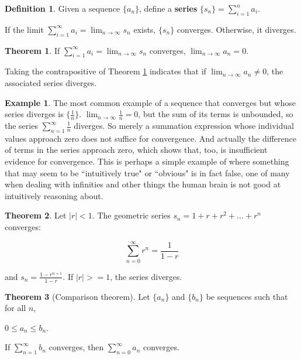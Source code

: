 \documentclass{article}
\theoremstyle{definition}
\newtheorem{definition}{Definition}[section]
\newtheorem{example}{Example}[section]
\newtheorem{theorem}{Theorem}[section]
\begin{document}
\begin{definition}
Given a sequence $\{a_n\}$, define a \textbf{series} $\{s_n\} = \sum\limits_{i=1}^n a_i$.

If the limit $\sum\limits_{i=1}^\infty a_i = \lim_{n \to \infty} s_n$ exists, $\{s_n\}$ converges. Otherwise, it diverges.
\end{definition}

\begin{theorem} \label{convergent-series-sequence}
If $\sum\limits_{i=1}^\infty a_i = \lim_{n \to \infty} s_n$ converges, $\lim_{n \to \infty} a_n = 0$.
\end{theorem}

Taking the contrapositive of Theorem \ref{convergent-series-sequence} indicates that if $\lim_{n \to \infty} a_n \neq 0$, the associated series diverges.

\begin{example} \label{harmonic-series-divergence}
The most common example of a sequence that converges but whose series diverges is $\{\frac{1}{n}\}$. $\lim_{n \to \infty} \frac{1}{n} = 0$, but the sum of its terms is unbounded, so the series $\sum\limits_{n=1}^\infty \frac{1}{n}$ diverges. So merely a summation expression whose individual values approach zero does not suffice for convergence. And actually the difference of terms in the series approach zero, which shows that, too, is insufficient evidence for convergence. This is perhaps a simple example of where something that may seem to be ``intuitively true" or ``obvious" is in fact false, one of many when dealing with infinities and other things the human brain is not good at intuitively reasoning about.
\end{example}

\begin{theorem} \label{geometric-series}
Let $|r| < 1$. The geometric series $s_n = 1 + r + r^2 + \ldots + r^n$ converges:

\begin{equation*}
\sum\limits_{n=0}^\infty r^n = \frac{1}{1-r}
\end{equation*}

and $s_n = \frac{1 - r^{n+1}}{1 - r}$. If $|r| >= 1$, the series diverges.
\end{theorem}

\begin{theorem}[Comparison theorem]
Let $\{a_n\}$ and $\{b_n\}$ be sequences such that for all $n$,

\begin{center}
$0 \leq a_n \leq b_n$.
\end{center}

If $\sum\limits_{n=1}^\infty b_n$ converges, then $\sum\limits_{n=0}^\infty a_n$ converges.
\end{theorem}
\end{document}
